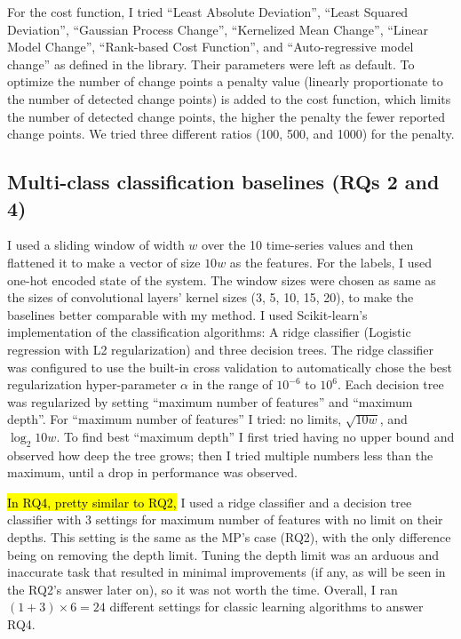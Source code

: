 For the cost function, I tried ``Least Absolute Deviation'', ``Least Squared Deviation'', ``Gaussian Process Change'', ``Kernelized Mean Change'', ``Linear Model Change'', ``Rank-based Cost Function'', and ``Auto-regressive model change'' as defined in the library. Their parameters were left as default.
To optimize the number of change points a penalty value (linearly proportionate to the number of detected change points) is added to the cost function, which limits the number of detected change points, the higher the penalty the fewer reported change points. We tried three different ratios (100, 500, and 1000) for the penalty.

\subsection{Multi-class classification baselines (RQs 2 and 4)}
I used a sliding window of width $w$ over the 10 time-series values and then flattened it to make a vector of size $10w$ as the features. For the labels, I used one-hot encoded state of the system.
The window sizes were chosen as same as the sizes of convolutional layers' kernel sizes (3, 5, 10, 15, 20), to make the baselines better comparable with my method. 
I used Scikit-learn's implementation of the classification algorithms: A ridge classifier (Logistic regression with L2 regularization) and three decision trees. The ridge classifier was configured to use the built-in cross validation to automatically chose the best regularization hyper-parameter $\alpha$ in the range of $10^{-6}$ to $10^6$. Each decision tree was regularized by setting ``maximum number of features'' and ``maximum depth''. For ``maximum number of features'' I tried: no limits, $\sqrt{10w}$, and $\log_2{10w}$. To find best ``maximum depth'' I first tried having no upper bound and observed how deep the tree grows; then I tried multiple numbers less than the maximum, until a drop in performance was observed. 

\hl{In RQ4, pretty similar to RQ2,} I used a ridge classifier and a decision tree classifier with 3 settings for maximum number of features with no limit on their depths. This setting is the same as the MP's case (RQ2), with the only difference being on removing the depth limit. Tuning the depth limit was an arduous and inaccurate task that resulted in minimal improvements (if any, as will be seen in the RQ2's answer later on), so it was not worth the time. Overall, I ran $(1+3)\times6=24$ different settings for classic learning algorithms to answer RQ4. 



